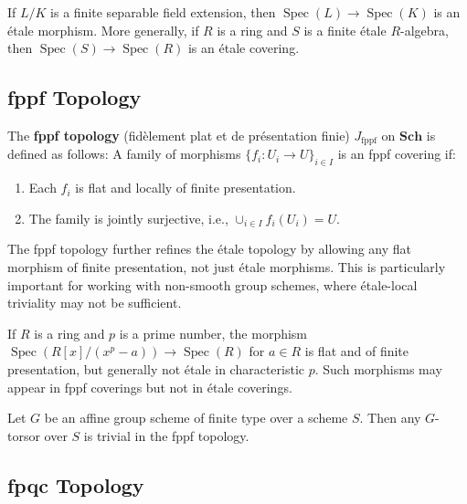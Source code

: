 \documentclass[12pt]{article}
\begin{document}
\begin{example}
    If $L/K$ is a finite separable field extension, then $\operatorname{Spec}(L) \to \operatorname{Spec}(K)$ is an étale morphism. More generally, if $R$ is a ring and $S$ is a finite étale $R$-algebra, then $\operatorname{Spec}(S) \to \operatorname{Spec}(R)$ is an étale covering.
\end{example}

\subsection{fppf Topology}

\begin{definition}
    The \textbf{fppf topology} (fidèlement plat et de présentation finie) $J_{\textrm{fppf}}$ on $\mathbf{Sch}$ is defined as follows: A family of morphisms $\{f_i: U_i \to U\}_{i \in I}$ is an fppf covering if:
    \begin{enumerate}
        \item Each $f_i$ is flat and locally of finite presentation.
        \item The family is jointly surjective, i.e., $\cup_{i \in I} f_i(U_i) = U$.
    \end{enumerate}
\end{definition}

\begin{remark}
    The fppf topology further refines the étale topology by allowing any flat morphism of finite presentation, not just étale morphisms. This is particularly important for working with non-smooth group schemes, where étale-local triviality may not be sufficient.
\end{remark}

\begin{example}
    If $R$ is a ring and $p$ is a prime number, the morphism $\operatorname{Spec}(R[x]/(x^p-a)) \to \operatorname{Spec}(R)$ for $a \in R$ is flat and of finite presentation, but generally not étale in characteristic $p$. Such morphisms may appear in fppf coverings but not in étale coverings.
\end{example}

\begin{theorem}[Grothendieck]
    Let $G$ be an affine group scheme of finite type over a scheme $S$. Then any $G$-torsor over $S$ is trivial in the fppf topology.
\end{theorem}

\subsection{fpqc Topology}
\end{document}
